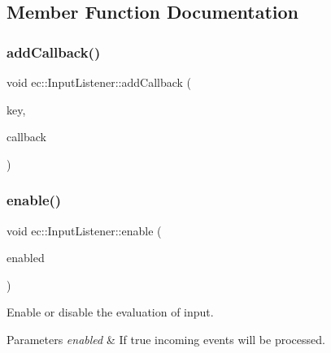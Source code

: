 \subsection{Member Function Documentation}
\mbox{\label{classec_1_1_input_listener_a803faa5cc3d7576a603944cc378a7246}} 
\subsubsection{\texorpdfstring{add\+Callback()}{addCallback()}}
{\footnotesize\ttfamily void ec\+::\+Input\+Listener\+::add\+Callback (\begin{DoxyParamCaption}\item[{\mbox{\hyperlink{classec_1_1_input_listener_af5dfb691564fa8e05fcf7f053e3c532b}{Event\+Key\+\_\+\+Type}}}]{key,  }\item[{\mbox{\hyperlink{classec_1_1_input_listener_aa622615b11dfc5cd1dce423fafe27c93}{Event\+Callback\+\_\+\+Type}}}]{callback }\end{DoxyParamCaption})}

\mbox{\label{classec_1_1_input_listener_a459a44443e7de70e854c2175b6c6914d}} 
\subsubsection{\texorpdfstring{enable()}{enable()}}
{\footnotesize\ttfamily void ec\+::\+Input\+Listener\+::enable (\begin{DoxyParamCaption}\item[{bool}]{enabled }\end{DoxyParamCaption})\hspace{0.3cm}{\ttfamily [virtual]}}



Enable or disable the evaluation of input. 


\begin{DoxyParams}{Parameters}
{\em enabled} & If true incoming events will be processed. \\
\hline
\end{DoxyParams}
\mbox{\label{classec_1_1_input_listener_a39e0803651e945e177336df2cf84d61b}} 
